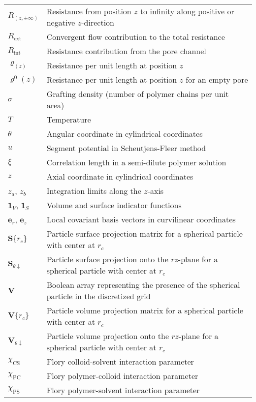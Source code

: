 \documentclass[10pt, a4paper, twocolumn]{article}
\begin{document}
\begin{tabularx}{\linewidth}{l X}
    $R_{(z, \pm\infty)}$ & Resistance from position $z$ to infinity along positive or negative $z$-direction \\
    $R_{\text{ext}}$ & Convergent flow contribution to the total resistance \\
    $R_{\text{int}}$ & Resistance contribution from the pore channel \\
    $\varrho_(z)$ & Resistance per unit length at position $z$ \\
    $\varrho^{0}(z)$ & Resistance per unit length at position $z$ for an empty pore \\
    $\sigma$ & Grafting density (number of polymer chains per unit area) \\
    $T$ & Temperature \\
    $\theta$ & Angular coordinate in cylindrical coordinates \\
    $u$ & Segment potential in Scheutjens-Fleer method\\
    $\xi$ & Correlation length in a semi-dilute polymer solution \\
    $z$ & Axial coordinate in cylindrical coordinates \\
    $z_a$, $z_b$ & Integration limits along the $z$-axis \\
    $\bm{1}_{V}$, $\bm{1}_{S}$ & Volume and surface indicator functions \\
    $\bm{e}_r$, $\bm{e}_z$ & Local covariant basis vectors in curvilinear coordinates \\
    $\bm{S}\{r_{c}\}$ & Particle surface projection matrix for a spherical particle with center at $r_{c}$ \\
    $\bm{S}_{\theta\downarrow}$ & Particle surface projection onto the $rz$-plane for a spherical particle with center at $r_{c}$ \\
    $\bm{V}$ & Boolean array representing the presence of the spherical particle in the discretized grid \\
    $\bm{V}\{r_{c}\}$ & Particle volume projection matrix for a spherical particle with center at $r_{c}$ \\
    $\bm{V}_{\theta\downarrow}$ & Particle volume projection onto the $rz$-plane for a spherical particle with center at $r_{c}$ \\
    $\chi_{\text{CS}}$ & Flory colloid-solvent interaction parameter \\
    $\chi_{\text{PC}}$ & Flory polymer-colloid interaction parameter \\
    $\chi_{\textrm{PS}}$ & Flory polymer-solvent interaction parameter \\
\end{tabularx}
%

\printbibliography
\end{document}
